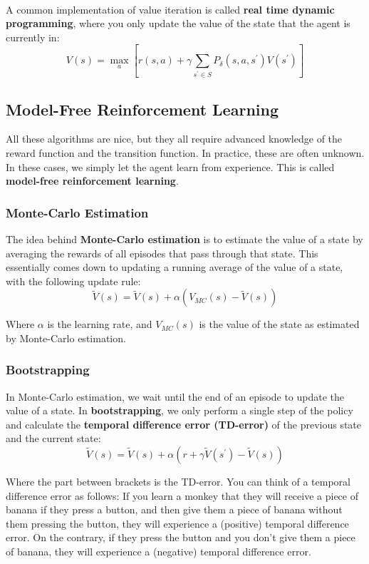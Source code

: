 \documentclass[12pt]{article}
\begin{document}
\noindent
\\
A common implementation of value iteration is called \textbf{real time dynamic programming}, where you only update the value of the state that the agent is currently in:
\[ V(s) = \max_a \left[ r(s, a) + \gamma \sum_{s^\prime \in S} P_\delta(s, a, s^\prime) V(s^\prime) \right] \]

\newpage
\subsection{Model-Free Reinforcement Learning}
All these algorithms are nice, but they all require advanced knowledge of the reward function and the transition function.
In practice, these are often unknown.
In these cases, we simply let the agent learn from experience.
This is called \textbf{model-free reinforcement learning}.

\subsubsection{Monte-Carlo Estimation}
The idea behind \textbf{Monte-Carlo estimation} is to estimate the value of a state by averaging the rewards of all episodes that pass through that state.
This essentially comes down to updating a running average of the value of a state, with the following update rule:
\[ \tilde{V}(s) = \tilde{V}(s) + \alpha \left( V_{MC}(s) - \tilde{V}(s) \right) \]

\noindent
Where $\alpha$ is the learning rate, and $V_{MC}(s)$ is the value of the state as estimated by Monte-Carlo estimation.

\subsubsection{Bootstrapping}
In Monte-Carlo estimation, we wait until the end of an episode to update the value of a state.
In \textbf{bootstrapping}, we only perform a single step of the policy and calculate the \textbf{temporal difference error (TD-error)} of the previous state and the current state:
\[ \tilde{V}(s) = \tilde{V}(s) + \alpha \left( r + \gamma \tilde{V}(s^\prime) - \tilde{V}(s) \right) \]

\noindent
Where the part between brackets is the TD-error.
You can think of a temporal difference error as follows:
If you learn a monkey that they will receive a piece of banana if they press a button, and then give them a piece of banana without them pressing the button, they will experience a (positive) temporal difference error.
On the contrary, if they press the button and you don't give them a piece of banana, they will experience a (negative) temporal difference error.
\end{document}
